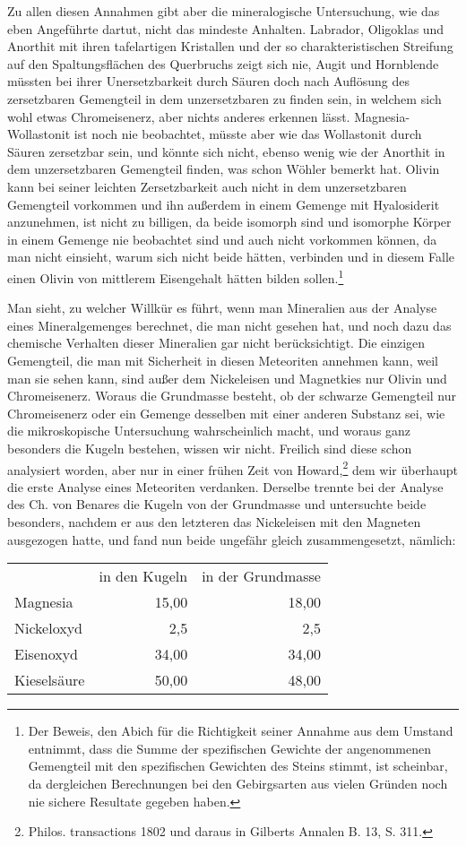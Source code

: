 \documentclass[a4paper, 11pt, oneside]{article}
\begin{document}
Zu allen diesen Annahmen gibt aber die mineralogische Untersuchung, wie das eben Angeführte dartut, nicht das mindeste Anhalten. Labrador, Oligoklas und Anorthit mit ihren tafelartigen Kristallen und der so charakteristischen Streifung auf den Spaltungsflächen des Querbruchs zeigt sich nie, Augit und Hornblende müssten bei ihrer Unersetzbarkeit durch Säuren doch nach Auflösung des zersetzbaren Gemengteil in dem unzersetzbaren zu finden sein, in welchem sich wohl etwas Chromeisenerz, aber nichts anderes erkennen lässt. Magnesia- Wollastonit ist noch nie beobachtet, müsste aber wie das Wollastonit durch Säuren zersetzbar sein, und könnte sich nicht, ebenso wenig wie der Anorthit in dem unzersetzbaren Gemengteil finden, was schon Wöhler bemerkt hat. Olivin kann bei seiner leichten Zersetzbarkeit auch nicht in dem unzersetzbaren Gemengteil vorkommen und ihn außerdem in einem Gemenge mit Hyalosiderit anzunehmen, ist nicht zu billigen, da beide isomorph sind und isomorphe Körper in einem Gemenge nie beobachtet sind und auch nicht vorkommen können, da man nicht einsieht, warum sich nicht beide hätten, verbinden und in diesem Falle einen Olivin von mittlerem Eisengehalt hätten bilden sollen.\footnote{Der Beweis, den Abich für die Richtigkeit seiner Annahme aus dem Umstand entnimmt, dass die Summe der spezifischen Gewichte der angenommenen Gemengteil mit den spezifischen Gewichten des Steins stimmt, ist scheinbar, da dergleichen Berechnungen bei den Gebirgsarten aus vielen Gründen noch nie sichere Resultate gegeben haben.}

Man sieht, zu welcher Willkür es führt, wenn man Mineralien aus der Analyse eines Mineralgemenges berechnet, die man nicht gesehen hat, und noch dazu das chemische Verhalten dieser Mineralien gar nicht berücksichtigt. Die einzigen Gemengteil, die man mit Sicherheit in diesen Meteoriten annehmen kann, weil man sie sehen kann, sind außer dem Nickeleisen und Magnetkies nur Olivin und Chromeisenerz. Woraus die Grundmasse besteht, ob der schwarze Gemengteil nur Chromeisenerz oder ein Gemenge desselben mit einer anderen Substanz sei, wie die mikroskopische Untersuchung wahrscheinlich macht, und woraus ganz besonders die Kugeln bestehen, wissen wir nicht. Freilich sind diese schon analysiert worden, aber nur in einer frühen Zeit von Howard,\footnote{Philos. transactions 1802 und daraus in Gilberts Annalen B. 13, S. 311.} dem wir überhaupt die erste Analyse eines Meteoriten verdanken. Derselbe trennte bei der Analyse des Ch. von Benares die Kugeln von der Grundmasse und untersuchte beide besonders, nachdem er aus den letzteren das Nickeleisen mit den Magneten ausgezogen hatte, und fand nun beide ungefähr gleich zusammengesetzt, nämlich:
\begin{center}
\begin{tabular}{ l r r }
     & in den Kugeln & in der Grundmasse\\
    Magnesia & 15,00 & 18,00\\
    Nickeloxyd & 2,5 & 2,5\\
    Eisenoxyd & 34,00 & 34,00\\
    Kieselsäure & 50,00 & 48,00\\
\end{tabular}
\end{center}
\end{document}
